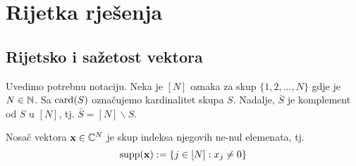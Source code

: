 \documentclass[a4paper,twoside,12pt]{memoir} %
\newcommand{\vect}[1]{\mathbf{#1}}
\renewcommand{\vec}{\vect}
\newcommand{\card}{\text{\normalfont{card}}}
\newcommand{\supp}{\text{\normalfont{supp}}}
\begin{document}
\chapter[Rijetka rje\v{s}enja][Rijetka rje\v{s}enja]{Rijetka rje\v{s}enja}\label{chapter_rijetka_rijesenja}	

\section[Rijetsko i sa\v{z}etost vektora][Rijetsko i sa\v{z}etost vektora]{Rijetsko i sa\v{z}etost vektora}
Uvedimo potrebnu notaciju. Neka je $[N]$ oznaka za skup $\{1,2,...,N\}$ gdje je $N\in\mathbb{N}$. Sa $\card(S)$ ozna\v{c}ujemo kardinalitet skupa $S$. Nadalje, $\bar{S}$ je komplement od $S$ u $[N]$, tj. $\bar{S}=[N]\backslash S$.

\begin{defn}
    Nosa\v{c} vektora $\vec{x} \in \C^{N}$ je skup indeksa njegovih ne-nul elemenata, tj.
    $$\supp(\vec{x}):=\{j\in[N]:x_j \neq 0 \}$$
\end{defn}
\end{document}
